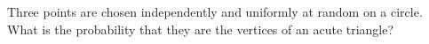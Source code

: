 Three points are chosen independently and uniformly at random on a circle. What is the probability that they are the vertices of an acute triangle?
